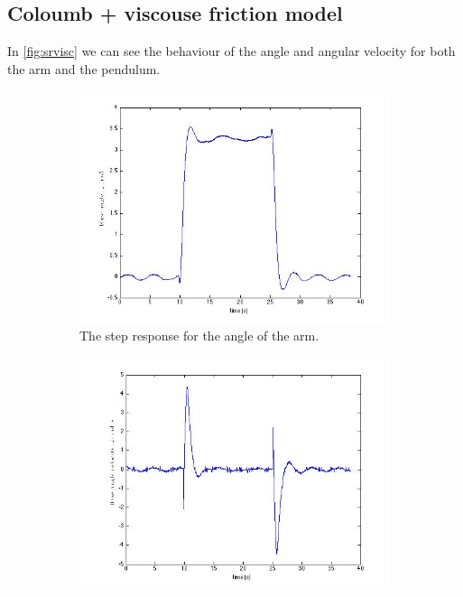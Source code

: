 \documentclass[10pt,a4paper]{article}
\begin{document}
\subsection{Coloumb + viscouse friction model}
In \ref{fig:srvisc} we can see the behaviour of the angle and angular velocity for both the arm and the pendulum.
\begin{figure}[H]
\centering
		\begin{subfigure}[t]{0.49\textwidth}
			\includegraphics[scale=0.33]{plots/steprespviscphi.jpg}
			\centering
			\caption{The step response for the angle of the arm.}
			\label{subfigure:srviscphi}
		\end{subfigure}
		\begin{subfigure}[t]{0.49\textwidth}
			\includegraphics[scale=0.33]{plots/steprespviscphidot.jpg}

\end{subfigure}
\end{figure}
\end{document}
